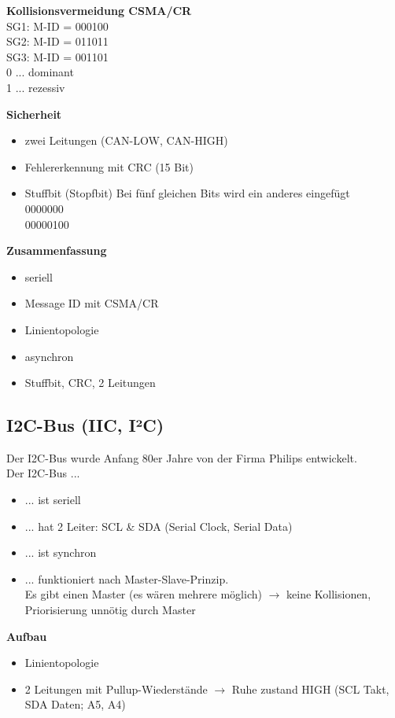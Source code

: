 \textbf{Kollisionsvermeidung CSMA/CR} \\
SG1: M-ID = 000100 \\
SG2: M-ID = 011011 \\
SG3: M-ID = 001101 \\
0 ... dominant \\
1 ... rezessiv

\textbf{Sicherheit} \\
\begin{itemize}
	\item zwei Leitungen (CAN-LOW, CAN-HIGH)
	\item Fehlererkennung mit CRC (15 Bit)
	\item Stuffbit (Stopfbit) Bei fünf gleichen Bits wird ein anderes eingefügt \\
	0000000 \\
	00000100
\end{itemize}

\textbf{Zusammenfassung} \\
\begin{itemize}
	\item seriell
	\item Message ID mit CSMA/CR
	\item Linientopologie
	\item asynchron
	\item Stuffbit, CRC, 2 Leitungen
\end{itemize}

\subsection{I2C-Bus (IIC, I²C)}
Der I2C-Bus wurde Anfang 80er Jahre von der Firma Philips entwickelt. \\
Der I2C-Bus ...
\begin{itemize}
	\item ... ist seriell
	\item ... hat 2 Leiter: SCL \& SDA (Serial Clock, Serial Data)
	\item ... ist synchron
	\item ... funktioniert nach Master-Slave-Prinzip. \\
	Es gibt einen Master (es wären mehrere möglich) $\rightarrow$ keine Kollisionen, Priorisierung unnötig durch Master
\end{itemize}

\textbf{Aufbau} \\
\begin{itemize}
	\item Linientopologie
	\item 2 Leitungen mit Pullup-Wiederstände $\rightarrow$ Ruhe zustand HIGH (SCL Takt, SDA Daten; A5, A4)
\end{itemize}

